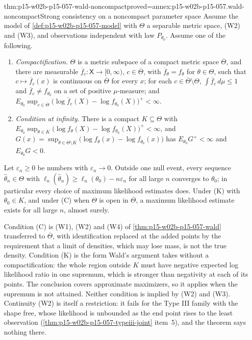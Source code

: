 \begin{hbtheorem}{thm:p15-w02b-p15-057-wald-noncompact}{proved=annex:p15-w02b-p15-057.wald-noncompact}{Strong consistency on a noncompact parameter space}
Assume the model of \cref{def:p15-w02b-p15-057-model} with \(\Theta\) a
separable metric space, (W2) and (W3), and observations independent with
law \(P_{\theta_0}\). Assume one of the following.
\begin{enumerate}
\item[(C)] \emph{Compactification.} \(\Theta\) is a metric subspace of a
 compact metric space \(\overline\Theta\), and there are measurable
 \(\overline f_c:\mathsf X\to[0,\infty)\), \(c\in\overline\Theta\), with
 \(\overline f_\theta=f_\theta\) for \(\theta\in\Theta\), such that
 \(c\mapsto\overline f_c(x)\) is continuous on \(\overline\Theta\) for
 every \(x\); for each \(c\in\overline\Theta\setminus\Theta\),
 \(\int\overline f_c\,d\mu\leq1\) and \(\overline f_c\neq f_{\theta_0}\) on
 a set of positive \(\mu\)-measure; and
 \(E_{\theta_0}\sup_{c\in\overline\Theta}\bigl(\log\overline f_c(X)
 -\log f_{\theta_0}(X)\bigr)^+<\infty\).
\item[(K)] \emph{Condition at infinity.} There is a compact
 \(K\subseteq\Theta\) with
 \(E_{\theta_0}\sup_{\theta\in K}\bigl(\log f_\theta(X)-\log
 f_{\theta_0}(X)\bigr)^+<\infty\), and
 \(G(x)=\sup_{\theta\in\Theta\setminus K}\bigl(\log f_\theta(x)-\log
 f_{\theta_0}(x)\bigr)\) has \(E_{\theta_0}G^+<\infty\) and
 \(E_{\theta_0}G<0\).
\end{enumerate}
Let \(\varepsilon_n\geq0\) be numbers with \(\varepsilon_n\to0\). Outside
one null event, every sequence \(\widehat\theta_n\in\Theta\) with
\(\ell_n(\widehat\theta_n)\geq\ell_n(\theta_0)-n\varepsilon_n\) for all
large \(n\) converges to \(\theta_0\); in particular every choice of
maximum likelihood estimates does. Under (K) with \(\theta_0\in K\), and
under (C) when \(\Theta\) is open in \(\overline\Theta\), a maximum
likelihood estimate exists for all large \(n\), almost surely.
\end{hbtheorem}

Condition (C) is (W1), (W2) and (W4) of
\cref{thm:p15-w02b-p15-057-wald} transferred to \(\overline\Theta\), with
identification replaced at the added points by the requirement that a
limit of densities, which may lose mass, is not the true density. Condition
(K) is the form Wald's argument takes without a compactification: the
whole region outside \(K\) must have negative expected log likelihood
ratio in one supremum, which is stronger than negativity at each of its
points. The conclusion covers approximate maximizers, so it applies when
the supremum is not attained. Neither condition is implied by (W2) and
(W3). Continuity (W2) is itself a restriction: it fails for the Type III
family with the shape free, whose likelihood is unbounded as the end point
rises to the least observation
(\cref{thm:p15-w02b-p15-057-typeiii-joint} item~5), and the theorem says
nothing there.

